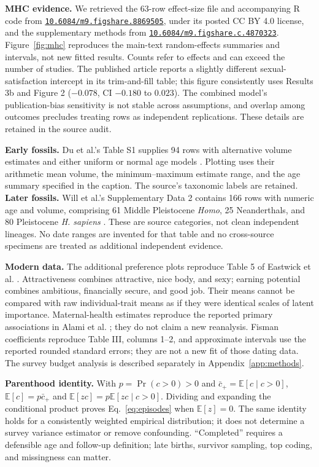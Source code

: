 \documentclass[10pt,twocolumn,letterpaper]{article}
\newcommand{\doi}[1]{\href{https://doi.org/#1}{\nolinkurl{#1}}}
\newcommand{\E}{\mathbb{E}}
\begin{document}
\textbf{MHC evidence.} We retrieved the 63-row effect-size file and accompanying R code from \doi{10.6084/m9.figshare.8869505}, under its posted CC BY 4.0 license, and the supplementary methods from \doi{10.6084/m9.figshare.c.4870323}. Figure~\ref{fig:mhc} reproduces the main-text random-effects summaries and intervals, not new fitted results. Counts refer to effects and can exceed the number of studies. The published article reports a slightly different sexual-satisfaction intercept in its trim-and-fill table; this figure consistently uses Results 3b and Figure 2 ($-0.078$, CI $-0.180$ to $0.023$). The combined model's publication-bias sensitivity is not stable across assumptions, and overlap among outcomes precludes treating rows as independent replications. These details are retained in the source audit.

\textbf{Early fossils.} Du et al.'s Table S1 supplies 94 rows with alternative volume estimates and either uniform or normal age models \citep{du2018}. Plotting uses their arithmetic mean volume, the minimum--maximum estimate range, and the age summary specified in the caption. The source's taxonomic labels are retained. \textbf{Later fossils.} Will et al.'s Supplementary Data 2 contains 166 rows with numeric age and volume, comprising 61 Middle Pleistocene \textit{Homo}, 25 Neanderthals, and 80 Pleistocene \textit{H. sapiens} \citep{will2021}. These are source categories, not clean independent lineages. No date ranges are invented for that table and no cross-source specimens are treated as additional independent evidence.

\textbf{Modern data.} The additional preference plots reproduce Table 5 of Eastwick et al. \citep{matching2025}. Attractiveness combines attractive, nice body, and sexy; earning potential combines ambitious, financially secure, and good job. Their means cannot be compared with raw individual-trait means as if they were identical scales of latent importance. Maternal-health estimates reproduce the reported primary associations in Alami et al. \citep{alami2020}; they do not claim a new reanalysis. Fisman coefficients reproduce Table III, columns 1--2, and approximate intervals use the reported rounded standard errors; they are not a new fit of those dating data. The survey budget analysis is described separately in Appendix~\ref{app:methods}.

\textbf{Parenthood identity.} With $p=\Pr(c>0)>0$ and $\bar c_+=\E[c\mid c>0]$, $\E[c]=p\bar c_+$ and $\E[zc]=p\E[zc\mid c>0]$. Dividing and expanding the conditional product proves Eq.~\eqref{eq:episodes} when $\E[z]=0$. The same identity holds for a consistently weighted empirical distribution; it does not determine a survey variance estimator or remove confounding. ``Completed'' requires a defensible age and follow-up definition; late births, survivor sampling, top coding, and missingness can matter.
\end{document}
